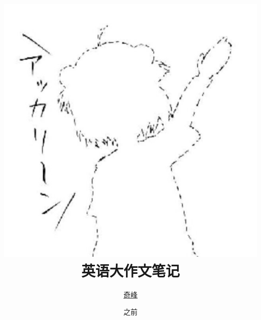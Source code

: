\documentclass[oneside]{book}
\title{\includegraphics[scale=0.6]{1.jpg}\\ \textsf{英语大作文笔记}}
\author{\href{https://qifengggg.github.io/}{奇峰}}
\date{之前}
\begin{document}
\theoremseparator{}
\newtheorem{def1}{定义}[section]
\newtheorem{theo1}{定理}[section]
\newtheorem{func1}{方法}[section]
\newtheorem{infer1}{推论}[section]
\newenvironment{proof}[1][证明]{\noindent\newline\textbf{#1}\quad{}}{\hfill $\blacksquare$\par}



\newenvironment{Def}[1][\quad{}]{\begin{def1}\textbf{#1}}{\end{def1}}
\newenvironment{Theo}[1][\quad{}]{\begin{theo1}\textbf{#1}}{\end{theo1}}
\newenvironment{Func}[1][\quad{}]{\begin{func1}\textbf{#1}}{\end{func1}}
\newenvironment{Infer}[1][\quad{}]{\begin{infer1}\textbf{#1}}{\end{infer1}}
\newenvironment{Field}[1][\quad{}]{\noindent\newline\textbf{#1}}{}

\setlength{\parskip}{3pt}

\renewcommand{\labelitemii}{$ \circ $ }

\frontmatter
\maketitle
\hypertarget{Index}{}
\tableofcontents

\mainmatter



\end{document}
